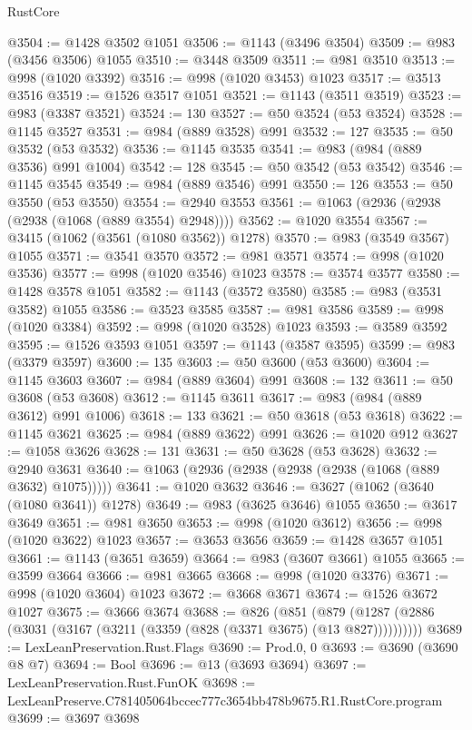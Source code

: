 \begin{lexlean}{RustCore}
\begin{coremodule}
@3504 := @1428 @3502 @1051
@3506 := @1143 (@3496 @3504)
@3509 := @983 (@3456 @3506) @1055
@3510 := @3448 @3509
@3511 := @981 @3510
@3513 := @998 (@1020 @3392)
@3516 := @998 (@1020 @3453) @1023
@3517 := @3513 @3516
@3519 := @1526 @3517 @1051
@3521 := @1143 (@3511 @3519)
@3523 := @983 (@3387 @3521)
@3524 := 130
@3527 := @50 @3524 (@53 @3524)
@3528 := @1145 @3527
@3531 := @984 (@889 @3528) @991
@3532 := 127
@3535 := @50 @3532 (@53 @3532)
@3536 := @1145 @3535
@3541 := @983 (@984 (@889 @3536) @991 @1004)
@3542 := 128
@3545 := @50 @3542 (@53 @3542)
@3546 := @1145 @3545
@3549 := @984 (@889 @3546) @991
@3550 := 126
@3553 := @50 @3550 (@53 @3550)
@3554 := @2940 @3553
@3561 := @1063 (@2936 (@2938 (@2938 (@1068 (@889 @3554) @2948))))
@3562 := @1020 @3554
@3567 := @3415 (@1062 (@3561 (@1080 @3562)) @1278)
@3570 := @983 (@3549 @3567) @1055
@3571 := @3541 @3570
@3572 := @981 @3571
@3574 := @998 (@1020 @3536)
@3577 := @998 (@1020 @3546) @1023
@3578 := @3574 @3577
@3580 := @1428 @3578 @1051
@3582 := @1143 (@3572 @3580)
@3585 := @983 (@3531 @3582) @1055
@3586 := @3523 @3585
@3587 := @981 @3586
@3589 := @998 (@1020 @3384)
@3592 := @998 (@1020 @3528) @1023
@3593 := @3589 @3592
@3595 := @1526 @3593 @1051
@3597 := @1143 (@3587 @3595)
@3599 := @983 (@3379 @3597)
@3600 := 135
@3603 := @50 @3600 (@53 @3600)
@3604 := @1145 @3603
@3607 := @984 (@889 @3604) @991
@3608 := 132
@3611 := @50 @3608 (@53 @3608)
@3612 := @1145 @3611
@3617 := @983 (@984 (@889 @3612) @991 @1006)
@3618 := 133
@3621 := @50 @3618 (@53 @3618)
@3622 := @1145 @3621
@3625 := @984 (@889 @3622) @991
@3626 := @1020 @912
@3627 := @1058 @3626
@3628 := 131
@3631 := @50 @3628 (@53 @3628)
@3632 := @2940 @3631
@3640 := @1063 (@2936 (@2938 (@2938 (@2938 (@1068 (@889 @3632) @1075)))))
@3641 := @1020 @3632
@3646 := @3627 (@1062 (@3640 (@1080 @3641)) @1278)
@3649 := @983 (@3625 @3646) @1055
@3650 := @3617 @3649
@3651 := @981 @3650
@3653 := @998 (@1020 @3612)
@3656 := @998 (@1020 @3622) @1023
@3657 := @3653 @3656
@3659 := @1428 @3657 @1051
@3661 := @1143 (@3651 @3659)
@3664 := @983 (@3607 @3661) @1055
@3665 := @3599 @3664
@3666 := @981 @3665
@3668 := @998 (@1020 @3376)
@3671 := @998 (@1020 @3604) @1023
@3672 := @3668 @3671
@3674 := @1526 @3672 @1027
@3675 := @3666 @3674
@3688 := @826
    (@851 (@879 (@1287 (@2886 (@3031 (@3167 (@3211 (@3359 (@828 (@3371 @3675) (@13 @827))))))))))
@3689 := LexLeanPreservation.Rust.Flags
@3690 := Prod.{0, 0}
@3693 := @3690 (@3690 @8 @7)
@3694 := Bool
@3696 := @13 (@3693 @3694)
@3697 := LexLeanPreservation.Rust.FunOK
@3698 := LexLeanPreserve.C781405064bccec777c3654bb478b9675.R1.RustCore.program
@3699 := @3697 @3698

\end{coremodule}
\end{lexlean}
